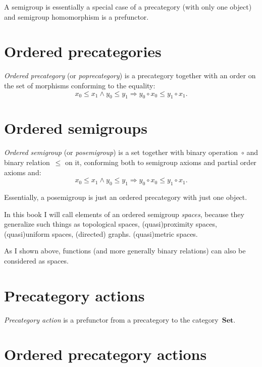 \begin{note}
A semigroup is essentially a special case of a precategory (with only one object) and semigroup homomorphism is a prefunctor.
\end{note}

\chapter{Ordered precategories}

\begin{defn}
\emph{Ordered precategory} (or \emph{poprecategory}) is
a precategory together with an order on the set of morphisms conforming to the equality:
\[ x_0\leq x_1\land y_0\leq y_1\Rightarrow y_0\circ x_0\leq y_1\circ x_1. \]
\end{defn}

\chapter{Ordered semigroups}

\begin{defn}
\emph{Ordered semigroup} (or \emph{posemigroup}) is a set together with binary operation~$\circ$ and binary relation~$\leq$ on it, conforming both to semigroup axioms and partial order axioms and:
\[ x_0\leq x_1\land y_0\leq y_1\Rightarrow y_0\circ x_0\leq y_1\circ x_1. \]
\end{defn}

Essentially, a posemigroup is just an ordered precategory with just one object.

In this book I will call elements of an ordered semigroup \emph{spaces}, because they generalize such things as topological spaces, (quasi)proximity spaces, (quasi)uniform spaces, (directed) graphs. (quasi)metric spaces.

As I shown above, functions (and more generally binary relations) can also be considered as spaces.

\chapter{Precategory actions}

\begin{defn}
\emph{Precategory action} is a prefunctor from a precategory to the category~$\mathbf{Set}$.
\end{defn}

\chapter{Ordered precategory actions}

